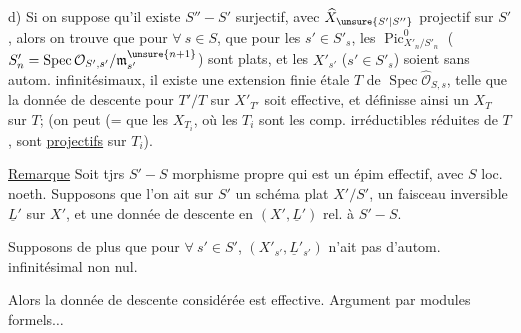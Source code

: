d) Si on suppose  qu'il existe $S''\mathbin{-}S'$   surjectif, avec $\widehat X_{\unsure{S'|S''}}$  projectif sur $S'$, alors on trouve que pour $\forall\ s\in S$,  que pour les $s'\in S'_s$, les $\operatorname{Pic}^0_{X'_n/S'_n}$ ($S'_n=\operatorname{Spec}\mathcal O_{S',s'}/\mathfrak m_{s'}^{\unsure{n+1}}$) sont plats, et  les $X'_{s'}$ ($s'\in S'_s$) soient sans autom. infinitésimaux, il existe une extension finie étale $T$ de $\operatorname{Spec}\widehat{\mathcal O}_{S,s}$, telle que la donnée de descente pour $T'/T$ sur $X'_{T'}$ soit effective, et définisse ainsi un $X_T$ sur $T$; (on peut (=  que les  $X_{T_i}$, où les $T_i$ sont les comp. irréductibles réduites de $T$, sont \uline{projectifs} sur $T_i$).

\uline{Remarque} Soit tjrs $S'\mathbin{-}S$ morphisme propre qui est un épim effectif, avec $S$ loc. noeth. Supposons que l'on ait sur $S'$ un schéma  plat $X'/S'$, un faisceau inversible $\underline L'$ sur $X'$, et une donnée de descente en $(X',\underline L')$ rel. à $S'\mathbin{-}S$.

 Supposons de plus que pour $\forall\ s'\in S'$, $(X'_{s'},\underline L'_{s'})$ n'ait pas d'autom. infinitésimal non nul.

Alors la donnée de descente considérée est effective. Argument par modules formels$\ldots$

